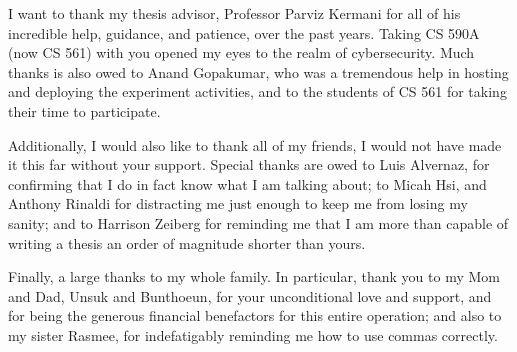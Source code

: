 \providecommand{\heading}[1]{\section{#1}}
\providecommand{\subheading}[1]{\subsection{#1}}

I want to thank my thesis advisor, Professor Parviz Kermani for all of his incredible help, guidance, and patience, over the past years. 
Taking CS 590A (now CS 561) with you opened my eyes to the realm of cybersecurity. 
Much thanks is also owed to Anand Gopakumar, who was a tremendous help in hosting and deploying the experiment activities, and to the students of CS 561 for taking their time to participate. 
	
Additionally, I would also like to thank all of my friends, I would not have made it this far without your support. 
Special thanks are owed to Luis Alvernaz, for confirming that I do in fact know what I am talking about; 
to Micah Hsi, and Anthony Rinaldi for distracting me just enough to keep me from losing my sanity; 
and to Harrison Zeiberg for reminding me that I am more than capable of writing a thesis an order of magnitude shorter than yours. 

Finally, a large thanks to my whole family. 
In particular, thank you to my Mom and Dad, Unsuk and Bunthoeun, for your unconditional love and support, and for being the generous financial benefactors for this entire operation; 
and also to my sister Rasmee, for indefatigably reminding me how to use commas correctly.
